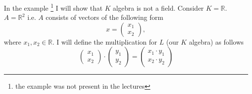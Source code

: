 \begin{example}
  In the example
  \footnote{the example was not present in the lectures}
  I will show
  that $K$ algebra is not a field. Consider
  $K = \mathbb{R}$.  $A = \mathbb{R}^2$ i.e.
  $A$ consists of vectors of the following form
  \[
  x = \left(
  \begin{array}{c}
    x_1 \\
    x_2
  \end{array}
  \right),
  \]
  where $x_1, x_2 \in \mathbb{R}$.
  I will define the multiplication for $L$ (our $K$ algebra) as
  follows
  \[
  \left(
  \begin{array}{c}
    x_1 \\
    x_2
  \end{array}
  \right)
  \cdot
  \left(
  \begin{array}{c}
    y_1 \\
    y_2
  \end{array}
  \right) =
  \left(
  \begin{array}{c}
    x_1 \cdot y_1 \\
    x_2 \cdot y_2
  \end{array}
  \right)
  \]


\end{example}
